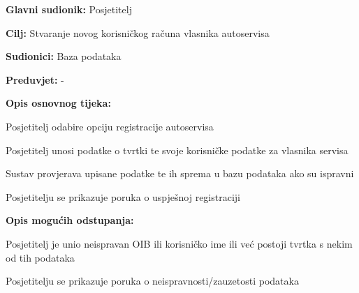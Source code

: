 \noindent {}
\begin{packed_item}
	\item \textbf{Glavni sudionik: } Posjetitelj
	\item  \textbf{Cilj:} Stvaranje novog korisničkog računa vlasnika
	autoservisa
	\item  \textbf{Sudionici:} Baza podataka
	\item  \textbf{Preduvjet:} -
	\item  \textbf{Opis osnovnog tijeka:}

	\item[] \begin{packed_enum}

		\item Posjetitelj odabire opciju registracije autoservisa
		\item Posjetitelj unosi podatke o tvrtki te svoje korisničke podatke za
		vlasnika servisa
		\item Sustav provjerava upisane podatke te ih sprema u bazu podataka ako su ispravni
		\item Posjetitelju se prikazuje poruka o uspješnoj registraciji
	\end{packed_enum}

	\item  \textbf{Opis mogućih odstupanja:}

	\item[] \begin{packed_item}

		\item[3.a] Posjetitelj je unio neispravan OIB ili korisničko ime ili već
		postoji tvrtka s nekim od tih podataka
		\item[] \begin{packed_enum}

			\item Posjetitelju se prikazuje poruka o neispravnosti/zauzetosti
			podataka

		\end{packed_enum}

	\end{packed_item}
\end{packed_item}

